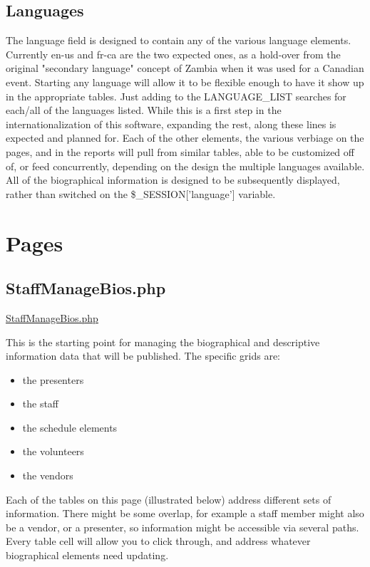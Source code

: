 \documentclass[captions=tablesignature]{scrartcl}
\begin{document}
\subsection{Languages}
\label{sec-2-4}

The language field is designed to contain any of the various
language elements.  Currently en-us and fr-ca are the two expected
ones, as a hold-over from the original "secondary language" concept
of Zambia when it was used for a Canadian event.  Starting any
language will allow it to be flexible enough to have it show up in
the appropriate tables.  Just adding to the LANGUAGE\_LIST searches
for each/all of the languages listed.  While this is a first step
in the internationalization of this software, expanding the rest,
along these lines is expected and planned for.  Each of the other
elements, the various verbiage on the pages, and in the reports
will pull from similar tables, able to be customized off of, or
feed concurrently, depending on the design the multiple languages
available.  All of the biographical information is designed to be
subsequently displayed, rather than switched on the
\$\_SESSION['language'] variable.

\section{Pages}
\label{sec-3}
\subsection{StaffManageBios.php}
\label{sec-3-1}
\label{StaffManageBios.php}
\underline{
\href{../webpages/StaffManageBios.php}{StaffManageBios.php}
}

This is the starting point for managing the biographical and
descriptive information data that will be published.  The specific
grids are:
\begin{itemize}
\item the presenters
\item the staff
\item the schedule elements
\item the volunteers
\item the vendors
\end{itemize}

Each of the tables on this page (illustrated below) address
different sets of information.  There might be some overlap, for
example a staff member might also be a vendor, or a presenter, so
information might be accessible via several paths.  Every table
cell will allow you to click through, and address whatever
biographical elements need updating.
\end{document}
